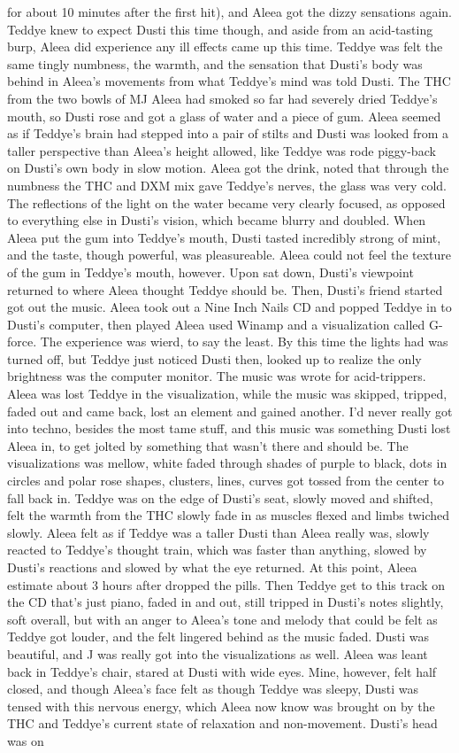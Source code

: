 \documentclass[12pt]{book}
\begin{document}
for about 10 minutes after the first hit), and Aleea got the dizzy sensations again. Teddye knew to expect Dusti this time though, and aside from an acid-tasting burp, Aleea did experience any ill effects came up this time. Teddye was felt the same tingly numbness, the warmth, and the sensation that Dusti's body was behind in Aleea's movements from what Teddye's mind was told Dusti. The THC from the two bowls of MJ Aleea had smoked so far had severely dried Teddye's mouth, so Dusti rose and got a glass of water and a piece of gum. Aleea seemed as if Teddye's brain had stepped into a pair of stilts and Dusti was looked from a taller perspective than Aleea's height allowed, like Teddye was rode piggy-back on Dusti's own body in slow motion. Aleea got the drink, noted that through the numbness the THC and DXM mix gave Teddye's nerves, the glass was very cold. The reflections of the light on the water became very clearly focused, as opposed to everything else in Dusti's vision, which became blurry and doubled. When Aleea put the gum into Teddye's mouth, Dusti tasted incredibly strong of mint, and the taste, though powerful, was pleasureable. Aleea could not feel the texture of the gum in Teddye's mouth, however. Upon sat down, Dusti's viewpoint returned to where Aleea thought Teddye should be. Then, Dusti's friend started got out the music. Aleea took out a Nine Inch Nails CD and popped Teddye in to Dusti's computer, then played Aleea used Winamp and a visualization called G-force. The experience was wierd, to say the least. By this time the lights had was turned off, but Teddye just noticed Dusti then, looked up to realize the only brightness was the computer monitor. The music was wrote for acid-trippers. Aleea was lost Teddye in the visualization, while the music was skipped, tripped, faded out and came back, lost an element and gained another. I'd never really got into techno, besides the most tame stuff, and this music was something Dusti lost Aleea in, to get jolted by something that wasn't there and should be. The visualizations was mellow, white faded through shades of purple to black, dots in circles and polar rose shapes, clusters, lines, curves got tossed from the center to fall back in. Teddye was on the edge of Dusti's seat, slowly moved and shifted, felt the warmth from the THC slowly fade in as muscles flexed and limbs twiched slowly. Aleea felt as if Teddye was a taller Dusti than Aleea really was, slowly reacted to Teddye's thought train, which was faster than anything, slowed by Dusti's reactions and slowed by what the eye returned. At this point, Aleea estimate about 3 hours after dropped the pills. Then Teddye get to this track on the CD that's just piano, faded in and out, still tripped in Dusti's notes slightly, soft overall, but with an anger to Aleea's tone and melody that could be felt as Teddye got louder, and the felt lingered behind as the music faded. Dusti was beautiful, and J was really got into the visualizations as well. Aleea was leant back in Teddye's chair, stared at Dusti with wide eyes. Mine, however, felt half closed, and though Aleea's face felt as though Teddye was sleepy, Dusti was tensed with this nervous energy, which Aleea now know was brought on by the THC and Teddye's current state of relaxation and non-movement. Dusti's head was on 
\end{document}
